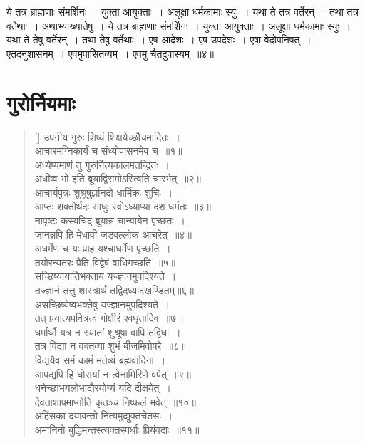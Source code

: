 \documentclass[twoside,12pt,notitlepage]{book}
\begin{document}
ये तत्र ब्राह्मणाः संमर्शिनः~। युक्ता आयुक्ताः~। अलूक्षा धर्मकामाः स्युः~। यथा ते तत्र वर्तेरन्~। तथा तत्र वर्तेथाः~। अथाभ्याख्यातेषु~। ये तत्र ब्राह्मणाः संमर्शिनः~। युक्ता आयुक्ताः~। अलूक्षा धर्मकामाः स्युः~। यथा ते तेषु वर्तेरन्~। तथा तेषु वर्तेथाः~। एष आदेशः~। एष उपदेशः~। एषा वेदोपनिषत्~। एतदनुशासनम्~। एवमुपासितव्यम्~। एवमु चैतदुपास्यम्~॥४॥\footA 

\clearpage
\section{गुरोर्नियमाः}
\begin{verse}[\versewidth]
उपनीय गुरुः शिष्यं शिक्षयेच्छौचमादितः~।\\[-6pt]
आचारमग्निकार्यं च संध्योपासनमेव च~॥१॥\\
अध्येष्यमाणं तु गुरुर्नित्यकालमतन्द्रितः~।\\[-6pt]
अधीष्व भो इति ब्रूयाद्विरामोऽस्त्विति चारभेत्~॥२॥\\
आचार्यपुत्रः शुश्रूषुर्ज्ञानदो धार्मिकः शुचिः~।\\[-6pt]
आप्तः शक्तोर्थदः साधुः स्वोऽध्याप्या दश धर्मतः~॥३॥\\
नापृष्टः कस्यचिद् ब्रूयान्न चान्यायेन पृच्छतः~।\\[-6pt]
जानन्नपि हि  मेधावी जडवल्लोक आचरेत्~॥४॥\footA \\
अधर्मेण च यः प्राह यश्चाधर्मेण पृच्छति~।\\[-6pt]
तयोरन्यतरः प्रैति विद्वेषं वाधिगच्छति~॥५॥\\
सच्छिष्यायातिभक्ताय यज्ज्ञानमुपदिश्यते~।\\[-6pt]
तज्ज्ञानं तत्तु शास्त्रार्थं तद्विदध्यादखण्डितम्॥६॥\\
असच्छिष्येष्वभक्तेषु यज्ज्ञानमुपदिश्यते~।\\[-6pt]
तत् प्रयात्यपवित्रत्वं गोक्षीरं श्वघृतादिव~॥७॥\\
धर्मार्थौ यत्र न स्यातां शुश्रूषा वापि तद्विधा~।\\[-6pt]
\footA तत्र विद्या न वक्तव्या शुभं बीजमिवोषरे~॥८॥\footB\ \\
विद्ययैव समं कामं मर्तव्यं ब्रह्मवादिना~।\\[-6pt]
आपद्यपि हि घोरायां न त्वेनामिरिणे वपेत्~॥९॥\footA \\
धनेच्छाभयलोभाद्यैरयोग्यं यदि दीक्षयेत्~।\\[-6pt]
देवताशापमाप्नोति कृतञ्च निष्फलं भवेत्~॥१०॥\\
अहिंसका दयावन्तो नित्यमुद्युक्तचेतसः~।\\[-6pt]
अमानिनो बुद्धिमन्तस्त्यक्तस्पर्धाः प्रियंवदाः~॥११॥\\

\end{verse}
\end{document}

